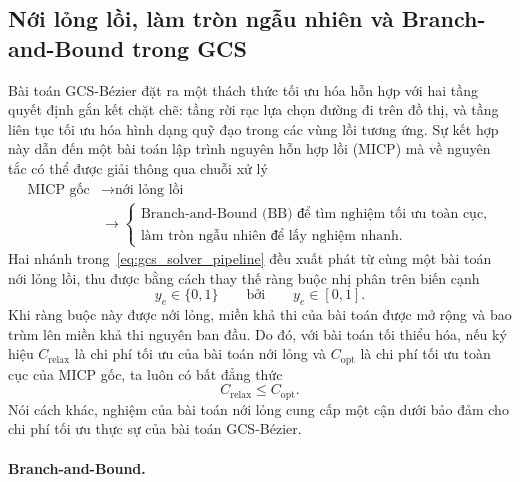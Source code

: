\subsection{Nới lỏng lồi, làm tròn ngẫu nhiên và Branch-and-Bound trong GCS}
\label{subsec:gcs_relaxation_rounding_bb}

Bài toán GCS-Bézier đặt ra một thách thức tối ưu hóa hỗn hợp với hai tầng quyết định gắn kết chặt chẽ: tầng rời rạc lựa chọn đường đi trên đồ thị, và tầng liên tục tối ưu hóa hình dạng quỹ đạo trong các vùng lồi tương ứng.
Sự kết hợp này dẫn đến một bài toán lập trình nguyên hỗn hợp lồi (MICP) mà về nguyên tắc có thể được giải thông qua chuỗi xử lý
\begin{equation}
    \begin{aligned}
        \text{MICP gốc}
        &\longrightarrow \text{nới lỏng lồi} \\
        &\longrightarrow
        \begin{cases}
            \text{Branch-and-Bound (BB) để tìm nghiệm tối ưu toàn cục,}\\
            \text{làm tròn ngẫu nhiên để lấy nghiệm nhanh.}
        \end{cases}
    \end{aligned}
    \label{eq:gcs_solver_pipeline}
\end{equation}
Hai nhánh trong~\eqref{eq:gcs_solver_pipeline} đều xuất phát từ cùng một bài toán nới lỏng lồi, thu được bằng cách thay thế ràng buộc nhị phân trên biến cạnh
\[
    y_e \in \{0,1\}
    \qquad \text{bởi} \qquad
    y_e \in [0,1].
\]
Khi ràng buộc này được nới lỏng, miền khả thi của bài toán được mở rộng và bao trùm lên miền khả thi nguyên ban đầu.
Do đó, với bài toán tối thiểu hóa, nếu ký hiệu $C_{\mathrm{relax}}$ là chi phí tối ưu của bài toán nới lỏng và $C_{\mathrm{opt}}$ là chi phí tối ưu toàn cục của MICP gốc, ta luôn có bất đẳng thức
\begin{equation}
    C_{\mathrm{relax}} \le C_{\mathrm{opt}}.
    \label{eq:gcs_relax_lower_bound}
\end{equation}
Nói cách khác, nghiệm của bài toán nới lỏng cung cấp một cận dưới bảo đảm cho chi phí tối ưu thực sự của bài toán GCS-Bézier.

\paragraph{Branch-and-Bound.}\mbox{}\\

